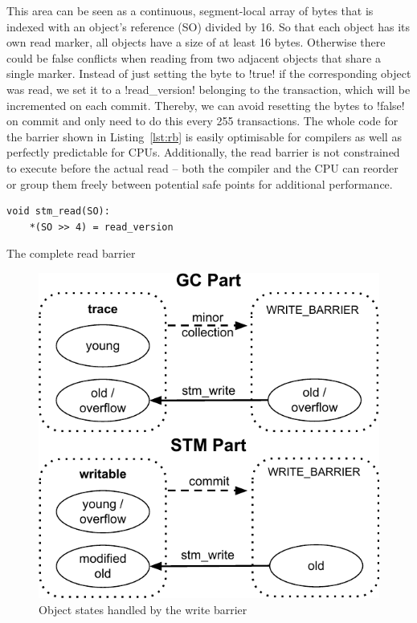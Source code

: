 \documentclass{sigplanconf}
\makeatletter
\renewcommand\lstinline[1][]{%
  \Collectverb{\@@myverb}%
}
\def\@@myverb#1{%
    \begingroup
    \fboxsep=0.2em
    \colorbox{verylightgray}{\oldlstinline|#1|}%
    \endgroup
}
\makeatother
\begin{document}
This area can be seen as a continuous, segment-local array of bytes
that is indexed with an object's reference (SO) divided by 16. So
that each object has its own read marker, all objects have a size of
at least 16 bytes. Otherwise there could be false conflicts when
reading from two adjacent objects that share a single marker.
Instead of just setting the byte to \lstinline!true!  if the
corresponding object was read, we set it to a \lstinline!read_version!
belonging to the transaction, which will be incremented on each
commit.  Thereby, we can avoid resetting the bytes to
\lstinline!false!  on commit and only need to do this every 255
transactions. The whole code for the barrier shown in
Listing~\ref{lst:rb} is easily optimisable for compilers as well as
perfectly predictable for CPUs. Additionally, the read barrier is not
constrained to execute before the actual read -- both the compiler and
the CPU can reorder or group them freely between potential safe points
for additional performance.

\begin{code}[h]
\begin{lstlisting}
void stm_read(SO):
    *(SO >> 4) = read_version
\end{lstlisting}
\caption{The complete read barrier\label{lst:rb}}
\end{code}

\begin{figure}[h]
  \centering
  \includegraphics[width=0.8\columnwidth]{object_states.pdf}
  \caption{Object states handled by the write barrier\label{fig:obj_states}}
\end{figure}
\end{document}
